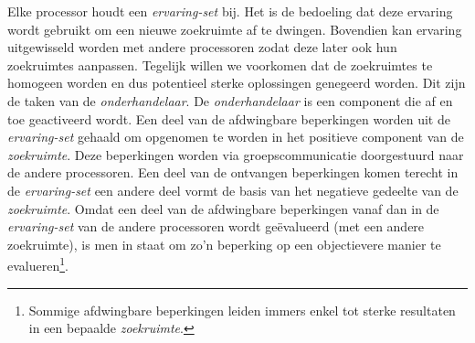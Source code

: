 Elke processor houdt een \emph{ervaring-set} bij. Het is de bedoeling dat deze ervaring wordt gebruikt om een nieuwe zoekruimte af te dwingen. Bovendien kan ervaring uitgewisseld worden met andere processoren zodat deze later ook hun zoekruimtes aanpassen. Tegelijk willen we voorkomen dat de zoekruimtes te homogeen worden en dus potentieel sterke oplossingen genegeerd worden. Dit zijn de taken van de \emph{onderhandelaar}. De \emph{onderhandelaar} is een component die af en toe geactiveerd wordt. Een deel van de afdwingbare beperkingen worden uit de \emph{ervaring-set} gehaald om opgenomen te worden in het positieve component van de \emph{zoekruimte}. Deze beperkingen worden via groepscommunicatie doorgestuurd naar de andere processoren. Een deel van de ontvangen beperkingen komen terecht in de \emph{ervaring-set} een andere deel vormt de basis van het negatieve gedeelte van de \emph{zoekruimte}. Omdat een deel van de afdwingbare beperkingen vanaf dan in de \emph{ervaring-set} van de andere processoren wordt ge\"evalueerd (met een andere zoekruimte), is men in staat om zo'n beperking op een objectievere manier te evalueren\footnote{Sommige afdwingbare beperkingen leiden immers enkel tot sterke resultaten in een bepaalde \emph{zoekruimte}.}.